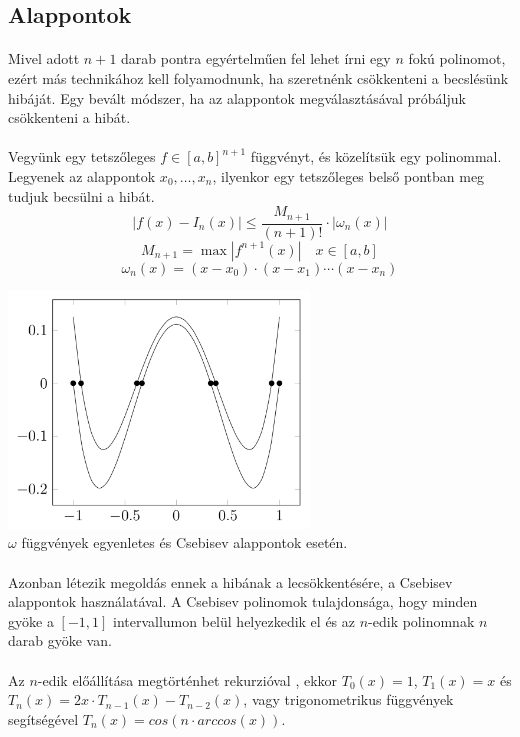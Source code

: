 \documentclass{elteikthesis}
\begin{document}
\subsection{Alappontok}
\paragraph{}
Mivel adott $n+1$ darab pontra egyértelműen fel lehet írni egy $n$ fokú polinomot, ezért más technikához kell folyamodnunk, ha szeretnénk csökkenteni a becslésünk hibáját. Egy bevált módszer, ha az alappontok megválasztásával próbáljuk csökkenteni a hibát.
\paragraph{}
Vegyünk egy tetszőleges $f \in [a,b]^{n+1}$ függvényt, és közelítsük egy polinommal. Legyenek az alappontok $x_0, \dots, x_n$, ilyenkor egy tetszőleges belső pontban meg tudjuk becsülni a hibát.
$$
|f(x) - I_n(x)| \leq \frac{M_{n+1}}{(n+1)!} \cdot |\omega_n(x)|
$$
$$
M_{n+1} = \max |f^{n+1}(x)| \quad x \in [a,b]
$$
$$
\omega_n(x) = (x-x_0)\cdot(x-x_1)\cdots(x-x_n)
$$
\begin{center}
\includegraphics[width=8cm]{pics/chebyshev_and_even}\\
{\footnotesize $\omega$ függvények egyenletes és Csebisev alappontok esetén.}
\end{center}
\paragraph{}
Azonban létezik megoldás ennek a hibának a lecsökkentésére, a Csebisev alappontok használatával. A Csebisev polinomok tulajdonsága, hogy minden gyöke a $[-1,1]$ intervallumon belül helyezkedik el és az $n$-edik polinomnak $n$ darab gyöke van.
\paragraph{}
Az $n$-edik előállítása megtörténhet rekurzióval , ekkor $T_0(x)=1$, $T_1(x) = x$ és $T_n(x) = 2x \cdot T_{n-1}(x)-T_{n-2}(x)$, vagy trigonometrikus függvények segítségével $T_n(x) = cos(n \cdot arccos(x))$.
\end{document}
